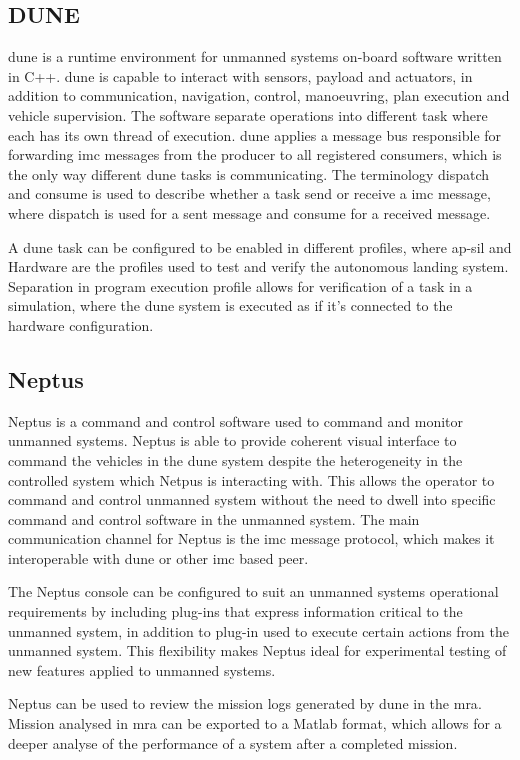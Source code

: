 \subsection{DUNE}
\acrfull{dune} is a runtime environment for unmanned systems on-board software written in C++. \gls{dune} is capable to interact with sensors, payload and actuators, in addition to communication, navigation, control, manoeuvring, plan execution and vehicle supervision. The software separate operations into different task where each has its own thread of execution. \gls{dune} applies a message bus responsible for forwarding \gls{imc} messages from the producer to all registered consumers, which is the only way different \gls{dune} tasks is communicating. The terminology dispatch and consume is used to describe whether a task send or receive a \gls{imc} message, where dispatch is used for a sent message and consume for a received message. 

A \gls{dune} task can be configured to be enabled in different profiles, where \gls{ap-sil} and Hardware are the profiles used to test and verify the autonomous landing system. Separation in program execution profile allows for verification of a task in a simulation, where the \gls{dune} system is executed as if it's connected to the hardware configuration.
 
\subsection{Neptus}
Neptus is a command and control software used to command and monitor unmanned systems. Neptus is able to provide coherent visual interface to command the vehicles in the \gls{dune} system despite the heterogeneity in the controlled system which Netpus is interacting with. This allows the operator to command and control unmanned system without the need to dwell into specific command and control software in the unmanned system. The main communication channel for Neptus is the \gls{imc} message protocol, which makes it interoperable with \gls{dune} or other \gls{imc} based peer.

The Neptus console can be configured to suit an unmanned systems operational requirements by including plug-ins that express information critical to the unmanned system, in addition to plug-in used to execute certain actions from the unmanned system. This flexibility makes Neptus ideal for experimental testing of new features  applied to unmanned systems.   

Neptus can be used to review the mission logs generated by \gls{dune} in the \gls{mra}. Mission analysed in \gls{mra} can be exported to a Matlab format, which allows for a deeper analyse of the performance of a system after a completed mission.
